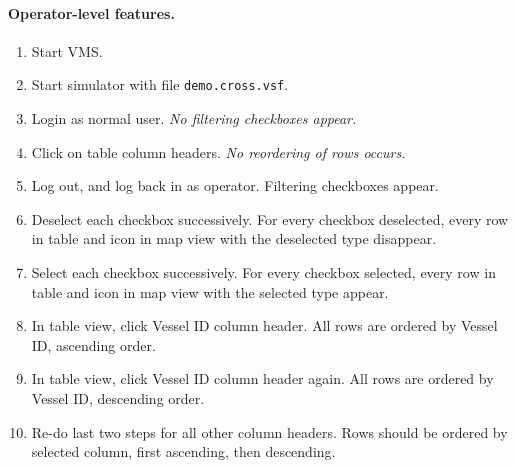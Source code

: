 \documentclass{article}
\begin{document}
\paragraph{Operator-level features.}
\begin{enumerate}
\item Start VMS.
\item Start simulator with file \verb|demo.cross.vsf|.
\item Login as normal user. \emph{No filtering checkboxes appear.}
\item Click on table column headers. \emph{No reordering of rows occurs.}
\item Log out, and log back in as operator. {Filtering checkboxes appear.}
\item Deselect each checkbox successively. {For every checkbox deselected, every row in table and icon in map view with the deselected type disappear.}
\item Select each checkbox successively. {For every checkbox selected, every row in table and icon in map view with the selected type appear.}
\item In table view, click Vessel ID column header. {All rows are ordered by Vessel ID, ascending order.}
\item In table view, click Vessel ID column header again. {All rows are ordered by Vessel ID, descending order.}
\item Re-do last two steps for all other column headers. {Rows should be ordered by selected column, first ascending, then descending.}
\end{enumerate}
\end{document}
